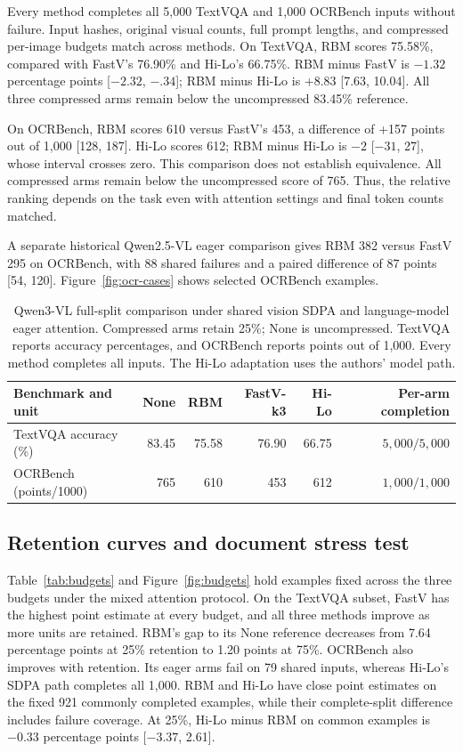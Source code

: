 \documentclass[10pt,twocolumn,letterpaper]{article}
\begin{document}
Every method completes all 5,000 TextVQA and 1,000 OCRBench inputs without failure. Input hashes, original visual counts, full prompt lengths, and compressed per-image budgets match across methods. On TextVQA, RBM scores 75.58\%, compared with FastV's 76.90\% and Hi-Lo's 66.75\%. RBM minus FastV is $-1.32$ percentage points [$-2.32$, $-.34$]; RBM minus Hi-Lo is +8.83 [7.63, 10.04]. All three compressed arms remain below the uncompressed 83.45\% reference.

On OCRBench, RBM scores 610 versus FastV's 453, a difference of +157 points out of 1,000 [128, 187]. Hi-Lo scores 612; RBM minus Hi-Lo is $-2$ [$-31$, 27], whose interval crosses zero. This comparison does not establish equivalence. All compressed arms remain below the uncompressed score of 765. Thus, the relative ranking depends on the task even with attention settings and final token counts matched.

A separate historical Qwen2.5-VL eager comparison gives RBM 382 versus FastV 295 on OCRBench, with 88 shared failures and a paired difference of 87 points [54, 120]. Figure~\ref{fig:ocr-cases} shows selected OCRBench examples.

\begin{table}[t]
\centering
\caption{\label{tab:fastv}Qwen3-VL full-split comparison under shared vision SDPA and language-model eager attention. Compressed arms retain 25\%; None is uncompressed. TextVQA reports accuracy percentages, and OCRBench reports points out of 1,000. Every method completes all inputs. The Hi-Lo adaptation uses the authors' model path.}
\small
\begin{tabular}{lrrrrr}
\toprule
Benchmark and unit & None & RBM & FastV-k3 & Hi-Lo & Per-arm completion\\
\midrule
TextVQA accuracy (\%) & 83.45 & 75.58 & 76.90 & 66.75 & $5{,}000/5{,}000$\\
OCRBench (points/1000) & 765 & 610 & 453 & 612 & $1{,}000/1{,}000$\\
\bottomrule
\end{tabular}
\end{table}

\subsection{Retention curves and document stress test}
Table~\ref{tab:budgets} and Figure~\ref{fig:budgets} hold examples fixed across the three budgets under the mixed attention protocol. On the TextVQA subset, FastV has the highest point estimate at every budget, and all three methods improve as more units are retained. RBM's gap to its None reference decreases from 7.64 percentage points at 25\% retention to 1.20 points at 75\%. OCRBench also improves with retention. Its eager arms fail on 79 shared inputs, whereas Hi-Lo's SDPA path completes all 1,000. RBM and Hi-Lo have close point estimates on the fixed 921 commonly completed examples, while their complete-split difference includes failure coverage. At 25\%, Hi-Lo minus RBM on common examples is $-0.33$ percentage points [$-3.37$, 2.61].
\end{document}
